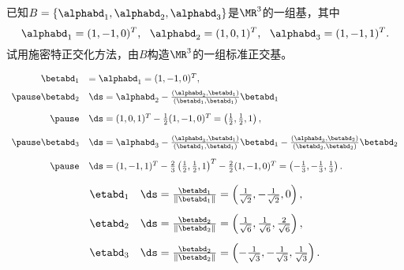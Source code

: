 \begin{frame}
  \begin{li}
    已知$B=\{\alphabd_1,\alphabd_2,\alphabd_3\}$是$\MR^3$的一组基，其中
    $$
    \alphabd_1=(1,-1,0)^T,~~
    \alphabd_2=(1,0,1)^T,~~
    \alphabd_3=(1,-1,1)^T.
    $$
    试用施密特正交化方法，由$B$构造$\MR^3$的一组标准正交基。
  \end{li}
  \pause
  \begin{jie}
    $$
    \begin{array}{rl}
      \betabd_1&=\alphabd_1=(1,-1,0)^T, \\[0.2cm]\pause
      \betabd_2&\ds=\alphabd_2-\frac{(\alphabd_2,\betabd_1)}{(\betabd_1,\betabd_1)}\betabd_1\\[0.4cm]\pause
               &\ds=(1,0,1)^T-\frac12(1,-1,0)^T=\left(\frac12,\frac12,1\right),\\[0.4cm]\pause
      \betabd_3&\ds=\alphabd_3-\frac{(\alphabd_3,\betabd_1)}{(\betabd_1,\betabd_1)}\betabd_1
                 -\frac{(\alphabd_3,\betabd_2)}{(\betabd_2,\betabd_2)}\betabd_2\\[0.4cm]\pause
               &\ds=(1,-1,1)^T-\frac23\left(\frac12,\frac12,1\right)^T-\frac22(1,-1,0)^T=\left(-\frac13,-\frac13,\frac13\right).
    \end{array}
    $$
  \end{jie}
\end{frame}


\begin{frame}
  \begin{jie}[续]
    $$
    \begin{array}{rl}
      \etabd_1&\ds =\frac{\betabd_1}{\|\betabd_1\|}=\left(\frac1{\sqrt{2}},-\frac1{\sqrt{2}},0\right),\\[0.4cm]
      \etabd_2&\ds =\frac{\betabd_2}{\|\betabd_2\|}=\left(\frac1{\sqrt{6}},\frac1{\sqrt{6}},\frac2{\sqrt{6}}\right),\\[0.4cm]
      \etabd_3&\ds =\frac{\betabd_2}{\|\betabd_2\|}=\left(-\frac1{\sqrt{3}},-\frac1{\sqrt{3}},\frac1{\sqrt{3}}\right).
    \end{array}
    $$
  \end{jie}
\end{frame}
